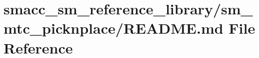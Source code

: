 \hypertarget{smacc__sm__reference__library_2sm__mtc__picknplace_2README_8md}{}\section{smacc\+\_\+sm\+\_\+reference\+\_\+library/sm\+\_\+mtc\+\_\+picknplace/\+R\+E\+A\+D\+ME.md File Reference}
\label{smacc__sm__reference__library_2sm__mtc__picknplace_2README_8md}
